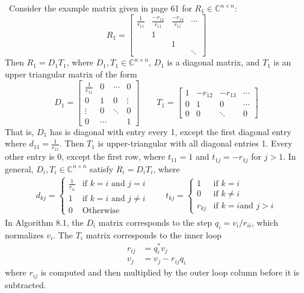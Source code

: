 \documentclass[12pt]{article}
\newenvironment{sol}[1][Solution]{\begin{trivlist}
		\item[\hskip \labelsep {\bfseries #1:}]}{\end{trivlist}}
\begin{document}
\begin{sol}
	\
	Consider the example matrix given in page 61 for $R_1\in\mathbb{C}^{n\times n}$:
	\[
	R_1=\begin{bmatrix}
		\frac{1}{r_{11}} & \frac{-r_{12}}{r_{11}} & \frac{-r_{13}}{r_{11}} & \cdots\\
		& 1 & {} & \\
		{} & {} & 1 & {}\\
		{} & {} & {} & \ddots
	\end{bmatrix}
	\]
	Then $R_1=D_1T_1$, where $D_1,T_1\in\mathbb{C}^{n\times n}$, $D_1$ is a diagonal matrix, and $T_1$ is
	an upper triangular matrix of the form
	\[
	D_1=\begin{bmatrix}
		\frac{1}{r_{11}} & 0 & \cdots & 0\\
		0 & 1 & 0 & \vdots\\
		\vdots & 0 & \ddots & 0\\
		0 & \cdots& {} & 1
	\end{bmatrix}
	\quad\quad
	T_1=\begin{bmatrix}
		1 & -r_{12} & -r_{13} & \cdots\\
		0 & 1 & 0 & \cdots\\
		0 & 0 & \ddots & 0
	\end{bmatrix}
	\]
	That is, $D_{1}$ has is diagonal with entry every 1, except the first diagonal entry where $d_{11}=\frac{1}{r_{11}}$.
	Then $T_1$ is upper-triangular with all diagonal entries 1. Every other entry is 0, except the first row,
	where $t_{11}=1$ and $t_{1j}=-r_{1j}$ for $j>1$. In general, $D_i,T_i\in\mathbb{C}^{n\times n}$
	satisfy $R_i=D_iT_i$, where
	\begin{align*}
		d_{kj}=\begin{cases}
			\frac{1}{r_{ii}} & \text{if }k=i\text{ and } j=i\\
			1 & \text{if }k=i \text{ and } j\neq i\\
			0 & \text{Otherwise}
		\end{cases}
		\quad\quad
		t_{kj} = \begin{cases}
			1 & \text{if } k = i\\
			0 & \text{if } k \neq i\\
			r_{kj} & \text{if } k = i \text{and } j > i
		\end{cases}
	\end{align*}
	In Algorithm 8.1, the $D_i$ matrix corresponds to the step $q_i=v_i/r_{ii}$, which normalizes $v_i$.
	The $T_i$ matrix corresponds to the inner loop
	\begin{align*}
	r_{ij}&=q_i^*v_j\\
	v_j&=v_j-r_{ij}q_i
	\end{align*}
	where $r_{ij}$ is computed and then multiplied by the outer loop column before it is subtracted.
\end{sol}
\end{document}
